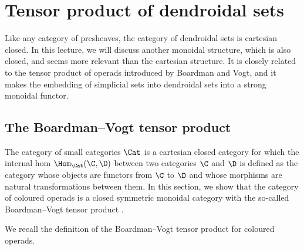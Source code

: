 \chapter{Tensor product of dendroidal sets}
\label{lecture04}
Like any category of presheaves, the category of dendroidal sets is cartesian closed. In this lecture, we will discuss another monoidal
structure, which is also closed, and seems more relevant than the cartesian structure. It is closely related to the tensor product of
operads introduced by Boardman and Vogt, and it makes the embedding of simplicial sets into dendroidal sets into a strong monoidal functor.
\section{The Boardman--Vogt tensor product}
\label{bvtensor}
The category of small categories $\Cat$ is a cartesian closed category for which the internal hom $\Hom_{\Cat}(\C, \D)$ between two categories $\C$ and $\D$ is defined as the category whose objects are functors from $\C$ to $\D$ and whose morphisms are natural transformations between them. In this section, we show that the category of coloured operads is a closed symmetric monoidal category with the so-called Boardman--Vogt tensor product \cite[Definition 2.14]{BV73}.

We recall the definition of the Boardman--Vogt tensor product for coloured operads.

